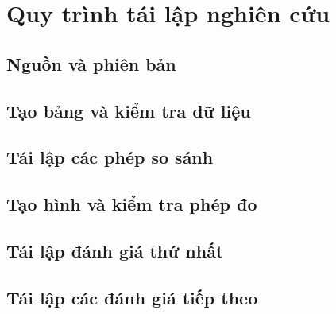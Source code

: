 \chapter{Quy trình tái lập nghiên cứu}\label{chap:appendices-reproducibility}

\par{}
\section{Nguồn và phiên bản}\label{section:reproducibility-2}

\par{}
\section{Tạo bảng và kiểm tra dữ liệu}\label{section:reproducibility-3}

\par{}
\section{Tái lập các phép so sánh}\label{section:reproducibility-4}

\par{}
\section{Tạo hình và kiểm tra phép đo}\label{section:reproducibility-5}

\par{}
\section{Tái lập đánh giá thứ nhất}\label{section:reproducibility-6}

\par{}
\section{Tái lập các đánh giá tiếp theo}\label{section:reproducibility-7}

